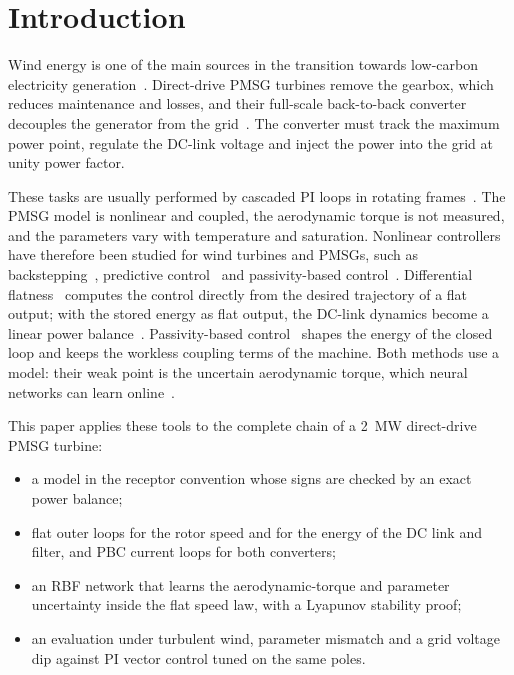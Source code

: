 \documentclass[conference]{IEEEtran}
\begin{document}
\section{Introduction}
Wind energy is one of the main sources in the transition towards low-carbon electricity
generation~\cite{iea2024,gwec2024}. Direct-drive PMSG turbines remove the gearbox, which reduces
maintenance and losses, and their full-scale back-to-back converter decouples the generator from the
grid~\cite{polinder2013,wu2011}. The converter must track the maximum power point, regulate the DC-link
voltage and inject the power into the grid at unity power factor.

These tasks are usually performed by cascaded PI loops in rotating frames~\cite{chinchilla2006,yazdani2010}.
The PMSG model is nonlinear and coupled, the aerodynamic torque is not measured, and the parameters vary
with temperature and saturation. Nonlinear controllers have therefore been studied for wind turbines
and PMSGs, such as backstepping~\cite{mechter2016}, predictive control~\cite{messadi2015} and
passivity-based control~\cite{takhi2020}. Differential flatness~\cite{fliess1995} computes the control
directly from the desired trajectory of a flat output; with the stored energy as flat output, the DC-link
dynamics become a linear power balance~\cite{thounthong2010}. Passivity-based control~\cite{ortega1998}
shapes the energy of the closed loop and keeps the workless coupling terms of the machine. Both methods
use a model: their weak point is the uncertain aerodynamic torque, which neural networks can learn
online~\cite{lewis1999,regani2026}.

This paper applies these tools to the complete chain of a 2~MW direct-drive PMSG turbine:
\begin{itemize}
\item a model in the receptor convention whose signs are checked by an exact power balance;
\item flat outer loops for the rotor speed and for the energy of the DC link and filter, and PBC
current loops for both converters;
\item an RBF network that learns the aerodynamic-torque and parameter uncertainty inside the flat speed
law, with a Lyapunov stability proof;
\item an evaluation under turbulent wind, parameter mismatch and a grid voltage dip against PI vector
control tuned on the same poles.
\end{itemize}
\end{document}
